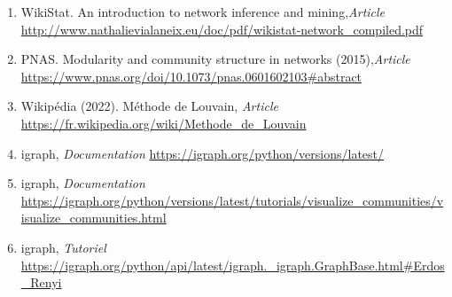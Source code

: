 \documentclass[11pt]{beamer}
\begin{document}
	\begin{frame}
		\scriptsize
		\begin{enumerate}
		\item WikiStat. An introduction to network inference and mining,\textit{Article}\newline
		\url{http://www.nathalievialaneix.eu/doc/pdf/wikistat-network_compiled.pdf} \newline

		\item PNAS. Modularity and community structure in networks (2015),\textit{Article}\newline
		\url{https://www.pnas.org/doi/10.1073/pnas.0601602103\#abstract}

		\item Wikipédia (2022). Méthode de Louvain, \textit{Article}\newline
		\url{https://fr.wikipedia.org/wiki/Methode_de_Louvain} \newline

		\item igraph, \textit{Documentation}\newline
		\url{https://igraph.org/python/versions/latest/}\newline

		\item igraph, \textit{Documentation}\newline
		\url{https://igraph.org/python/versions/latest/tutorials/visualize_communities/visualize_communities.html}\newline

		\item igraph, \textit{Tutoriel}\newline
		\url{https://igraph.org/python/api/latest/igraph._igraph.GraphBase.html\#Erdos_Renyi}
		\end{enumerate}
	\end{frame}
\end{document}
